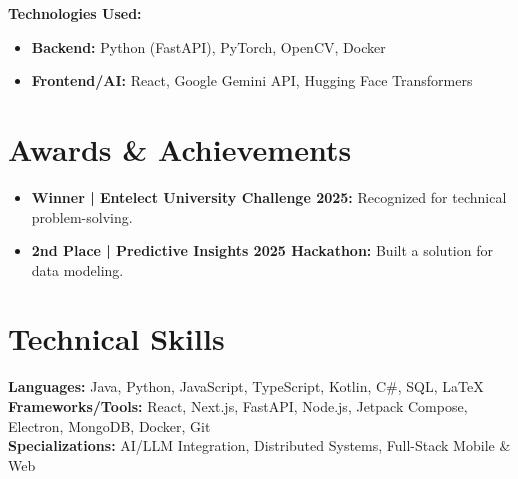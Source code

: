 \documentclass[a4paper,10pt]{article}
\begin{document}
\textbf{Technologies Used:}
\begin{itemize}
    \item \textbf{Backend:} Python (FastAPI), PyTorch, OpenCV, Docker
    \item \textbf{Frontend/AI:} React, Google Gemini API, Hugging Face Transformers
\end{itemize}

\vspace{10pt}

\section*{Awards \& Achievements}

\begin{itemize}
    \item \textbf{Winner | Entelect University Challenge 2025:} Recognized for technical problem-solving.
    \item \textbf{2nd Place | Predictive Insights 2025 Hackathon:} Built a solution for data modeling.
\end{itemize}

\vspace{10pt}

\section*{Technical Skills}

\textbf{Languages:} Java, Python, JavaScript, TypeScript, Kotlin, C\#, SQL, \LaTeX \\
\textbf{Frameworks/Tools:} React, Next.js, FastAPI, Node.js, Jetpack Compose, Electron, MongoDB, Docker, Git \\
\textbf{Specializations:} AI/LLM Integration, Distributed Systems, Full-Stack Mobile \& Web
\end{document}
